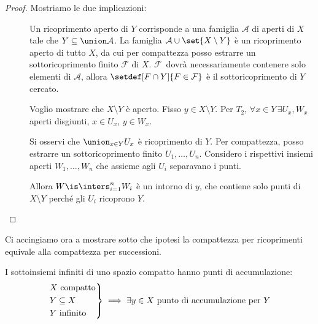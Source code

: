 \begin{proof}
	Mostriamo le due implicazioni:
	\begin{description}
		\item[\proofleftarrow]
			Un ricoprimento aperto di $Y$ corrisponde a una famiglia $\mathcal A$ di aperti di $X$ tale che $Y\subseteq \union\mathcal A$.
			La famiglia $\mathcal A \cup \set{X\setminus Y}$ è un ricoprimento aperto di tutto $X$,
			da cui per compattezza posso estrarre un sottoricoprimento finito $\mathcal F$ di $X$.
			$\mathcal F$~dovrà necessariamente contenere solo elementi di $\mathcal A$,
			allora $\setdef[F\cap Y]{F\in\mathcal F}$ è il sottoricoprimento di $Y$ cercato.\footnotemark
		\item[\proofrightarrow]
			Voglio mostrare che $X\setminus Y$ è aperto.
			Fisso $y\in X\setminus Y$.
			Per $T_2$, $\forall x\in Y\, \exists U_x, W_x$ aperti disgiunti, $x\in U_x$, $y\in W_x$.

			Si osservi che $\union_{x\in Y}U_x$ è ricoprimento di $Y$. Per compattezza, posso estrarre un sottoricoprimento finito $U_1,\dots, U_n$.
			Considero i rispettivi insiemi aperti $W_1,\dots, W_n$ che assieme agli $U_i$ separavano i punti.

			Allora $W\is \inters_{i=1}^nW_i$ è un intorno di $y$,
			che contiene solo punti di $X\setminus Y$ perché gli $U_i$ ricoprono $Y$.
		\qedhere
	\end{description}
\end{proof}


Ci accingiamo ora a mostrare sotto che ipotesi la compattezza per ricoprimenti equivale alla compattezza per successioni.

\begin{lemma}
	\label{th:infcompacc}
	I sottoinsiemi infiniti di uno spazio compatto hanno punti di accumulazione:
	\[\begin{rcases}
		\text{$X$ compatto} \\
		Y\subseteq X \\
		\text{$Y$ infinito}
	\end{rcases}\implies
	\exists y\in X\text{ punto di accumulazione per }Y\]
\end{lemma}

